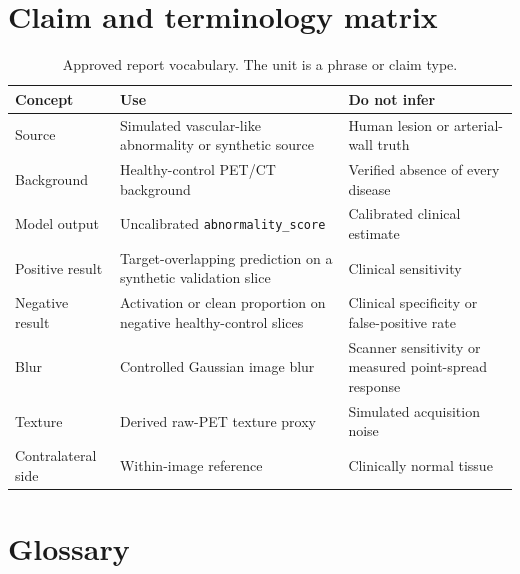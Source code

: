 \documentclass[11pt]{article}
\newcommand{\scoreterm}{\texttt{abnormality\_score}}
\begin{document}
\section{Claim and terminology matrix}

\begin{table}[H]
\centering
\caption{Approved report vocabulary. The unit is a phrase or claim type.}
\begin{tabularx}{\textwidth}{B{0.24\textwidth} Y Y}
\toprule
Concept & Use & Do not infer \\
\midrule
Source & Simulated vascular-like abnormality or synthetic source & Human lesion or arterial-wall truth \\
Background & Healthy-control PET/CT background & Verified absence of every disease \\
Model output & Uncalibrated \scoreterm & Calibrated clinical estimate \\
Positive result & Target-overlapping prediction on a synthetic validation slice & Clinical sensitivity \\
Negative result & Activation or clean proportion on negative healthy-control slices & Clinical specificity or false-positive rate \\
Blur & Controlled Gaussian image blur & Scanner sensitivity or measured point-spread response \\
Texture & Derived raw-PET texture proxy & Simulated acquisition noise \\
Contralateral side & Within-image reference & Clinically normal tissue \\
\bottomrule
\end{tabularx}
\end{table}

\section{Glossary}
\end{document}
